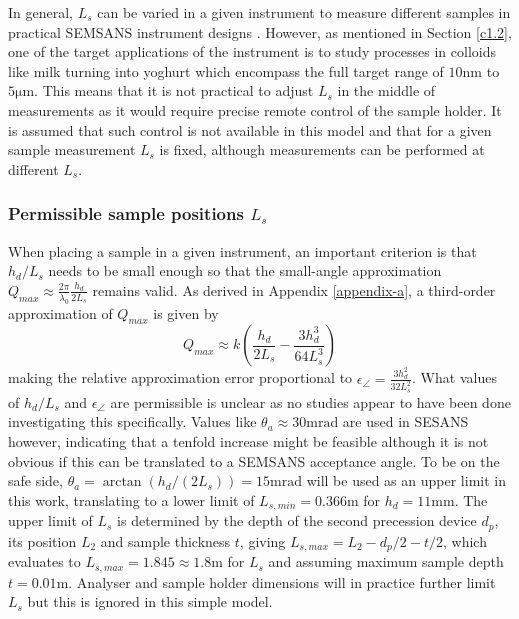 \documentclass{article}
\begin{document}
In general, $L_s$ can be varied in a given instrument to measure different samples in practical SEMSANS instrument designs \cite{kusmin2017}. However, as mentioned in Section \ref{c1.2}, one of the target applications of the instrument is to study processes in colloids like milk turning into yoghurt which encompass the full target range of $10 \unit{\nano\meter}$ to $5 \unit{\micro\meter}$. This means that it is not practical to adjust $L_s$ in the middle of measurements as it would require precise remote control of the sample holder. It is assumed that such control is not available in this model and that for a given sample measurement $L_s$ is fixed, although measurements can be performed at different $L_s$.  

\subsubsection{Permissible sample positions $L_s$}
When placing a sample in a given instrument, an important criterion is that $h_d/L_s$ needs to be small enough so that the small-angle approximation $Q_{max} \approx \frac{2\pi}{\lambda_0}\frac{h_d}{2L_s}$ remains valid. As derived in Appendix \ref{appendix-a}, a third-order approximation of $Q_{max}$ is given by
$$Q_{max} \approx  k(\frac{h_d}{2L_s} - \frac{3h_d^3}{64L_s^3})$$
making the relative approximation error proportional to $\epsilon_\angle = \frac{3h_d^2}{32L_s^2}$. What values of $h_d/L_s$ and $\epsilon_\angle$ are permissible is unclear as no studies appear to have been done investigating this specifically. Values like $\theta_a \approx 30\unit{\milli\radian}$ are used in SESANS \cite{rekveldt1996} however, indicating that a tenfold increase might be feasible although it is not obvious if this can be translated to a SEMSANS acceptance angle. To be on the safe side, $\theta_a = \arctan\left(h_d / (2L_s)\right) = 15\unit{\milli\radian}$ will be used as an upper limit in this work, translating to a lower limit of $L_{s,min} = 0.366\unit{\meter}$ for $h_d = 11\unit{\milli\meter}$. 
The upper limit of $L_s$ is determined by the depth of the second precession device $d_p$, its position $L_2$ and sample thickness $t$, giving $L_{s,max} = L_2 - d_p / 2 - t/2$, which evaluates to $L_{s,max} = 1.845 \approx 1.8\unit\meter$ for $L_s$ and assuming maximum sample depth $t=0.01\unit\meter$. Analyser and sample holder dimensions will in practice further limit $L_s$ but this is ignored in this simple model.

\end{document}
